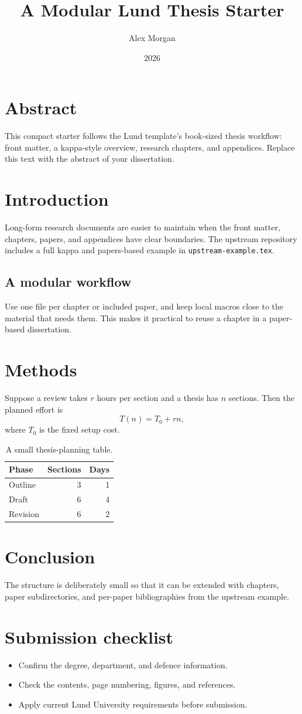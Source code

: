 \documentclass[10pt,twoside,openright]{book}
\title{A Modular Lund Thesis Starter}
\author{Alex Morgan}
\date{2026}
\begin{document}
\frontmatter
\maketitle
\chapter*{Abstract}
This compact starter follows the Lund template's book-sized thesis workflow:
front matter, a kappa-style overview, research chapters, and appendices.
Replace this text with the abstract of your dissertation.
\tableofcontents
\mainmatter
\chapter{Introduction}
\label{ch:introduction}
Long-form research documents are easier to maintain when the front matter,
chapters, papers, and appendices have clear boundaries. The upstream repository
includes a full kappa and papers-based example in \texttt{upstream-example.tex}.
\section{A modular workflow}
Use one file per chapter or included paper, and keep local macros close to the
material that needs them. This makes it practical to reuse a chapter in a
paper-based dissertation.
\chapter{Methods}
\label{ch:methods}
Suppose a review takes $r$ hours per section and a thesis has $n$ sections.
Then the planned effort is
\begin{equation}
  T(n)=T_0+rn,
\end{equation}
where $T_0$ is the fixed setup cost.
\begin{table}[ht]
  \centering
  \caption{A small thesis-planning table.}
  \begin{tabular}{lrr}
    \toprule
    Phase & Sections & Days \\
    \midrule
    Outline & 3 & 1 \\
    Draft & 6 & 4 \\
    Revision & 6 & 2 \\
    \bottomrule
  \end{tabular}
\end{table}
\chapter{Conclusion}
The structure is deliberately small so that it can be extended with chapters,
paper subdirectories, and per-paper bibliographies from the upstream example.
\appendix
\chapter{Submission checklist}
\begin{itemize}
  \item Confirm the degree, department, and defence information.
  \item Check the contents, page numbering, figures, and references.
  \item Apply current Lund University requirements before submission.
\end{itemize}
\backmatter
\end{document}
